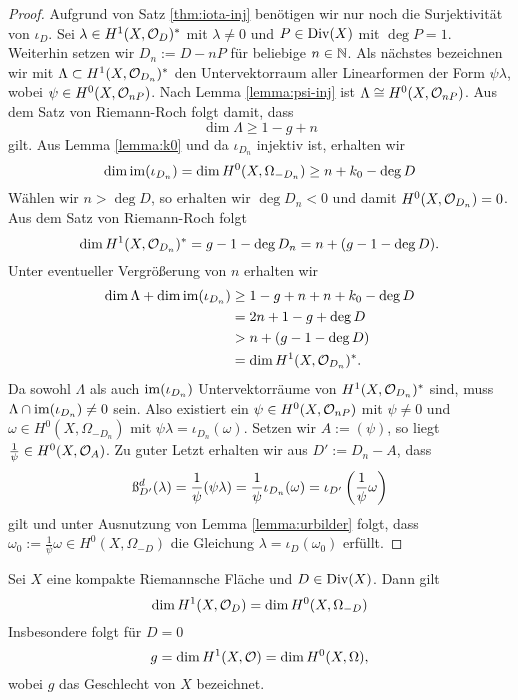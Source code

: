 \begin{proof}
  Aufgrund von Satz \ref{thm:iota-inj} benötigen wir nur noch die
  Surjektivität von $\iota_D$. Sei $\lambda \in H^1(X, \mathcal{O}_D)^\ast$
  mit $\lambda \neq 0$ und $P \in \operatorname{Div}(X)$ mit $\deg P = 1$. Weiterhin
  setzen wir $D_n := D - n P$ für beliebige $n \in \mathbb{N}$. Als nächstes
  bezeichnen wir mit $\Lambda \subset H^1(X, \mathcal{O}_{D_n})^\ast$ den
  Untervektorraum aller Linearformen der Form $\psi \lambda$, wobei
  $\psi \in H^0(X, \mathcal{O}_{nP})$. Nach Lemma \ref{lemma:psi-inj} ist
  $\Lambda \cong H^0(X, \mathcal{O}_{nP})$. Aus dem Satz von Riemann-Roch
  folgt damit, dass
  \[
  \dim \Lambda \geq 1 - g + n
  \]
  gilt. Aus Lemma \ref{lemma:k0} und da $\iota_{D_n}$ injektiv ist,
  erhalten wir
  \[
  \dim \operatorname{im}(\iota_{D_n}) = \dim H^0(X, \Omega_{-D_n}) \geq n + k_0 -
  \deg D
  \]
  Wählen wir $n > \deg D$, so erhalten wir $\deg D_n < 0$ und damit
  $H^0(X, \mathcal{O}_{D_n}) = 0$. Aus dem Satz von Riemann-Roch folgt
  \[
  \dim H^1(X, \mathcal{O}_{D_n})^\ast = g - 1 - \deg D_n = n + ( g - 1 -
  \deg D).
  \]
  Unter eventueller Vergrößerung von $n$ erhalten wir
  \begin{align*}
    \dim \Lambda + \dim \operatorname{im}(\iota_{D_n}) & \geq 1 - g + n + n + k_0 -
    \deg D \\
    & = 2 n + 1 - g + \deg D \\
    & > n + (g - 1 - \deg D) \\
    & = \dim H^1(X, \mathcal{O}_{D_n})^\ast.
  \end{align*}
  Da sowohl $\Lambda$ als auch $\operatorname{im}(\iota_{D_n})$ Untervektorräume von
  $H^1(X, \mathcal{O}_{D_n})^\ast$ sind, muss $\Lambda \cap \operatorname{im}(\iota_{D_n})
  \neq 0$ sein. Also existiert ein $\psi \in H^0(X, \mathcal{O}_{nP})$ mit
  $\psi \neq 0$ und $\omega \in H^0(X, \Omega_{-D_n})$ mit $\psi
  \lambda = \iota_{D_n}(\omega)$. Setzen wir $A := (\psi)$, so liegt
  $\frac{1}{\psi} \in H^0(X, \mathcal{O}_A)$. Zu guter Letzt erhalten wir aus
  $D' := D_n - A$, dass
  \begin{align*}
    \i_{D'}^d(\lambda) = \frac{1}{\psi} (\psi \lambda) =
    \frac{1}{\psi} \iota_{D_n}(\omega) = \iota_{D'} \left (
      \frac{1}{\psi} \omega \right )
  \end{align*}
  gilt und unter Ausnutzung von Lemma \ref{lemma:urbilder} folgt, dass
  $\omega_0 := \frac{1}{\psi} \omega \in H^0(X, \Omega_{-D})$ die
  Gleichung $\lambda = \iota_D(\omega_0)$ erfüllt.
\end{proof}

\begin{cor}
  Sei $X$ eine kompakte Riemannsche Fläche und $D \in \operatorname{Div}(X)$. Dann
  gilt
  \[
  \dim H^1(X, \mathcal{O}_D) = \dim H^0(X, \Omega_{-D})
  \]
  Insbesondere folgt für $D = 0$
  \[
  g = \dim H^1(X, \mathcal{O}) = \dim H^0(X, \Omega),
  \]
  wobei $g$ das Geschlecht von $X$ bezeichnet.
\end{cor}


